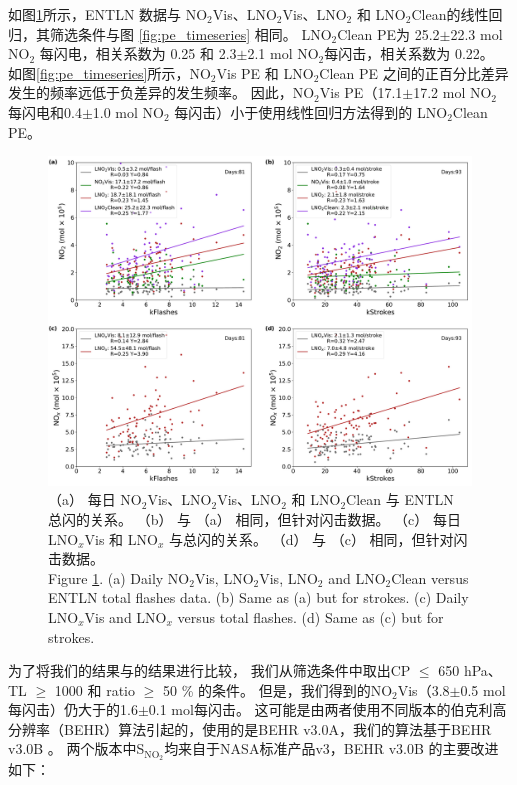 如图\ref{fig:pe_linear}所示，ENTLN 数据与 NO$_2$Vis、LNO$_2$Vis、LNO$_2$ 和 LNO$_2$Clean的线性回归，其筛选条件与图 \ref{fig:pe_timeseries} 相同。
LNO$_2$Clean PE为 25.2$\pm$22.3 mol NO$_2$ 每闪电，相关系数为 0.25 和 2.3$\pm$2.1 mol NO$_2$每闪击，相关系数为 0.22。
如图\ref{fig:pe_timeseries}所示，NO$_2$Vis PE 和 LNO$_2$Clean PE 之间的正百分比差异发生的频率远低于负差异的发生频率。
因此，NO$_2$Vis PE（17.1$\pm$17.2 mol NO$_2$ 每闪电和0.4$\pm$1.0 mol NO$_2$ 每闪击）小于使用线性回归方法得到的 LNO$_2$Clean PE。

\begin{figure}[t]
    \includegraphics[width=15cm]{./figures/pe_linear.pdf}
    \caption{（a） 每日 NO$_2$Vis、LNO$_2$Vis、LNO$_2$ 和 LNO$_2$Clean 与 ENTLN 总闪的关系。
    （b） 与 （a） 相同，但针对闪击数据。
    （c） 每日 LNO$_x$Vis 和 LNO$_x$ 与总闪的关系。
    （d） 与 （c） 相同，但针对闪击数据。\\
    Figure \ref{fig:pe_linear}. (a) Daily NO$_2$Vis, LNO$_2$Vis, LNO$_2$ and LNO$_2$Clean versus ENTLN total flashes data.
    (b) Same as (a) but for strokes. (c) Daily LNO$_x$Vis and LNO$_x$ versus total flashes. (d) Same as (c) but for strokes.}
    \label{fig:pe_linear}
\end{figure}

为了将我们的结果与\citet{Lapierre.2020}的结果进行比较，
我们从筛选条件中取出CP $\leq$ 650 hPa、TL $\geq$ 1000 和 ratio $\geq$ 50 \% 的条件。
但是，我们得到的NO$_2$Vis（3.8$\pm$0.5 mol每闪击）仍大于\citet{Lapierre.2020}的1.6$\pm$0.1 mol每闪击。
这可能是由两者使用不同版本的伯克利高分辨率（BEHR）算法引起的，\citet{Lapierre.2020}使用的是BEHR v3.0A，我们的算法基于BEHR v3.0B \citep{Laughner.2019a}。
两个版本中S$_{\textrm{NO$_2$}}$均来自于NASA标准产品v3，BEHR v3.0B 的主要改进如下：

